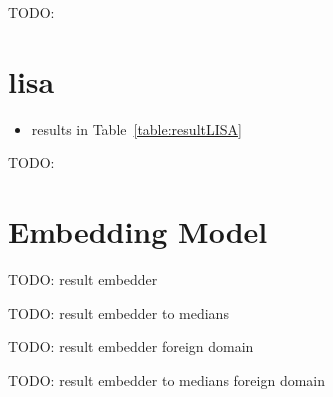 \begin{table}[ht]
  \resultSfam{}
  \label{table:resultSFAM}
  \caption{TODO:}
\end{table}


\section{\acs{lisa}}
\begin{itemize}
  \item results in Table~\ref{table:resultLISA}

\end{itemize}

\begin{table}[ht]
  \resultLisa{}
  \label{table:resultLISA}
  \caption{TODO:}
\end{table}


\section{Embedding Model}

\begin{table}
  \resultEmbedder{}
  \label{table:resultEmbedder}
  \caption{TODO: result embedder}
\end{table}

\begin{table}
  \resultEmbedderToMedians{}
  \label{table:resultEmbedderToMedians}
  \caption{TODO: result embedder to medians}
\end{table}

\begin{table}
  \resultEmbedderForeignDomain{}
  \label{table:resultEmbedderForeignDomain}
  \caption{TODO: result embedder foreign domain}
\end{table}

\begin{table}
  \resultEmbedderToMediansForeignDomain{}
  \label{table:resultEmbedderToMediansForeignDomain}
  \caption{TODO: result embedder to medians foreign domain}
\end{table}

